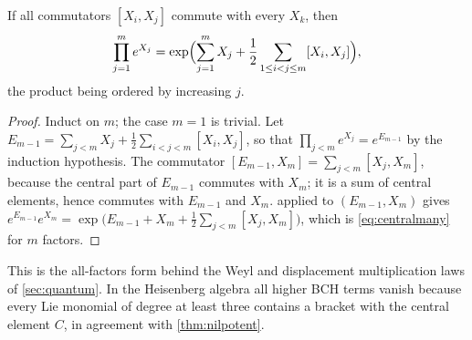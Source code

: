 \begin{corollary}\label{cor:centralmany}
If all commutators $[X_i,X_j]$ commute with every $X_k$, then
\begin{equation}\label{eq:centralmany}
 \prod_{j=1}^{m}e^{X_j}
 =\exp\Bigl(\sum_{j=1}^{m}X_j+\frac12\sum_{1\leq i<j\leq m}[X_i,X_j]\Bigr),
\end{equation}
the product being ordered by increasing $j$.
\end{corollary}
\begin{proof}
Induct on $m$; the case $m=1$ is trivial. Let $E_{m-1}=\sum_{j<m}X_j
+\frac12\sum_{i<j<m}[X_i,X_j]$, so that $\prod_{j<m}e^{X_j}=e^{E_{m-1}}$ by
the induction hypothesis. The commutator $[E_{m-1},X_m]=\sum_{j<m}[X_j,X_m]$,
because the central part of $E_{m-1}$ commutes with $X_m$; it is a sum of
central elements, hence commutes with $E_{m-1}$ and $X_m$. 
applied to $(E_{m-1},X_m)$ gives
$e^{E_{m-1}}e^{X_m}=\exp\bigl(E_{m-1}+X_m+\frac12\sum_{j<m}[X_j,X_m]\bigr)$,
which is \eqref{eq:centralmany} for $m$ factors.
\end{proof}
This is the all-factors form behind the Weyl and displacement
multiplication laws of \cref{sec:quantum}. In the Heisenberg algebra all
higher BCH terms vanish because every Lie monomial of degree at least three
contains a bracket with the central element $C$, in agreement with
\cref{thm:nilpotent}.

